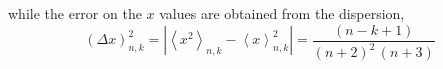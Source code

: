 \documentclass[
twocolumn,
aps,prd,
nofootinbib,
superscriptaddress,
showpacs,ligh
tightenlines, 
]{revtex4}
\begin{document}
while the error on the $x$ values are obtained from the dispersion, 
\begin{equation}\label{eq:174}
(\Delta x)_{n,k}^{2} = \left| \left\langle x^2  \right\rangle_{n,k} - \left\langle x  \right\rangle_{n,k}^2 \right| = \frac{(n-k+1)}{(n+2)^{2} \, (n+3) } 
\end{equation}
\end{document}
